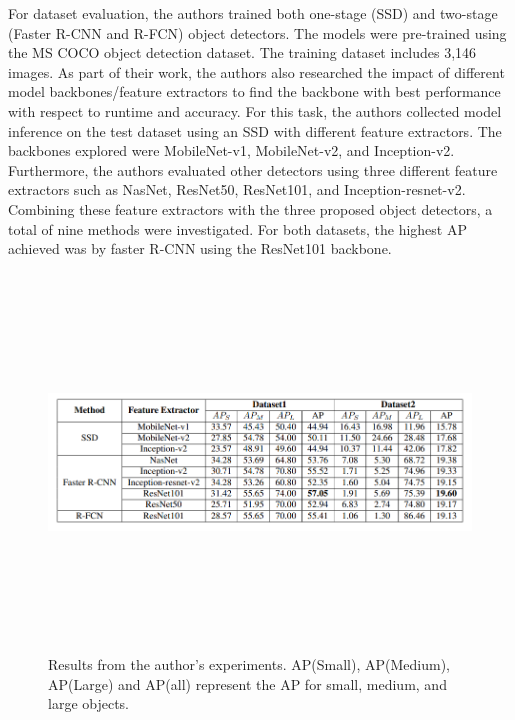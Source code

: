 For dataset evaluation, the authors trained both one-stage (SSD) and two-stage (Faster R-CNN and R-FCN) object detectors. The models were pre-trained using the MS COCO object detection dataset. The training dataset includes 3,146 images. As part of their work, the authors also researched the impact of different model backbones/feature extractors to find the backbone with best performance with respect to runtime and accuracy. For this task, the authors collected model inference on the test dataset using an SSD with different feature extractors. The backbones explored were MobileNet-v1, MobileNet-v2, and Inception-v2. Furthermore, the authors evaluated other detectors using three different feature extractors such as NasNet, ResNet50, ResNet101, and
Inception-resnet-v2. Combining these feature extractors
with the three proposed object detectors, a total of nine methods were investigated. For both datasets, the highest AP achieved was by faster R-CNN using the ResNet101 backbone. 
\begin{figure}[H]
    \centering
    \includegraphics[width=\textwidth,height=10cm,keepaspectratio=true]{src/Images/solv_results.PNG}
    \caption{
     Results from the author's experiments\cite{soloviev2020comparing}. AP(Small), AP(Medium), AP(Large) and AP(all) represent the AP for small, medium, and large objects.\cite{soloviev2020comparing}
     }
\end{figure}
\\

